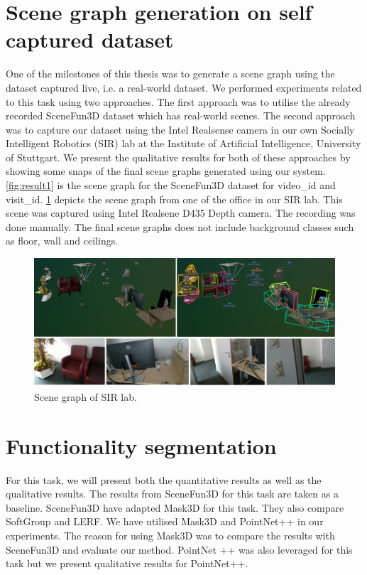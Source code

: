 \section{Scene graph generation on self captured dataset}
\label{sec:SG}
One of the milestones of this thesis was to generate a scene graph using the dataset captured live, i.e. a real-world dataset. We performed experiments related to
 this task using two approaches. The first approach was to utilise the already recorded SceneFun3D dataset which has real-world scenes. The second approach was 
to capture our dataset using the Intel Realsense camera in our own Socially Intelligent Robotics (SIR) lab at the Institute of Artificial Intelligence, 
University of Stuttgart. We present the qualitative results for both of these approaches by showing some snaps of the final scene graphs generated 
using our system. \cref{fig:result1} is the scene graph for the SceneFun3D dataset for video\_id and visit\_id. \cref{fig:result2} 
depicts the scene graph from one of the office in our SIR lab. This scene was captured using Intel Realsene D435 Depth camera. The recording was done manually.
The final scene graphs does not include background classes such as  floor, wall and ceilings.

\begin{figure}[ht!]
    \centering
    \includegraphics[width=\textwidth]{content/images/results/SIR_SG.png}
    \caption{Scene graph of SIR lab.}
    \label{fig:result2}
\end{figure}
\section{Functionality segmentation}
\label{sec:FS}
For this task, we will present both the quantitative results as well as the qualitative results. The results from SceneFun3D for this task are taken as a baseline. 
SceneFun3D have adapted Mask3D for this task. They also compare SoftGroup and LERF. We have utilised Mask3D and PointNet++ in our experiments. The reason for using 
Mask3D was to compare the results with SceneFun3D and evaluate our method. PointNet ++ was also leveraged for this task but we present qualitative results for PointNet++.

